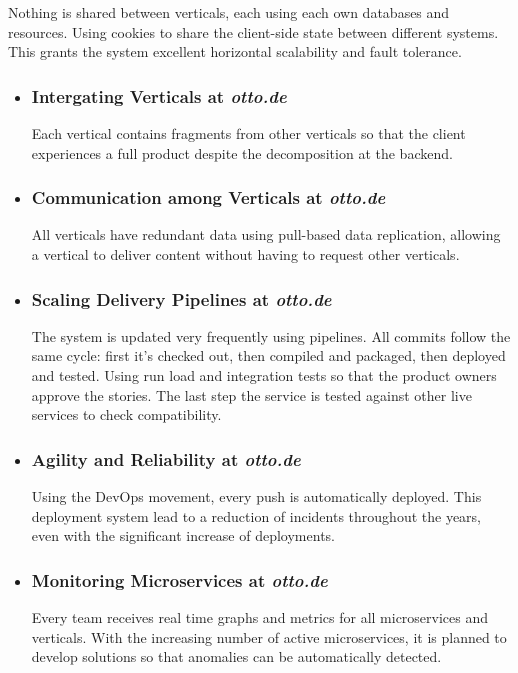 \documentclass[14pt]{extarticle}
\begin{document}
Nothing is shared between verticals, each using each own databases and resources. Using cookies to share the client-side state between different systems. This grants the system excellent horizontal scalability and fault tolerance.


\begin{itemize}
	\item \subsubsection{Intergating Verticals at \textit{otto.de}} 
	Each vertical contains fragments from other verticals so that the client experiences a full product despite the decomposition at the backend.
	\item \subsubsection{Communication among Verticals at \textit{otto.de}}
	All verticals have redundant data using pull-based data replication, allowing a vertical to deliver content without having to request other verticals.
	\item \subsubsection{Scaling Delivery Pipelines at \textit{otto.de}} 
	The system is updated very frequently using pipelines. All commits follow the same cycle: first it's checked out, then compiled and packaged, then deployed and tested. Using run load and integration tests so that the product owners approve the stories. The last step the service is tested against other live services to check compatibility.
	\item \subsubsection{Agility and Reliability at \textit{otto.de}} 
	Using the DevOps movement, every push is automatically deployed. This deployment system lead to a reduction of incidents throughout the years, even with the significant increase of deployments.
	\item \subsubsection{Monitoring Microservices at \textit{otto.de}}
	Every team receives real time graphs and metrics for all microservices and verticals. With the increasing number of active microservices, it is planned to develop solutions so that anomalies can be automatically detected.

\end{itemize}
\end{document}
